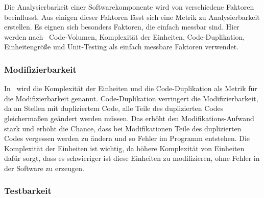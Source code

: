 \documentclass[12pt, a4paper, ngerman]{article}
\begin{document}
Die Analysierbarkeit einer Softwarekomponente wird von verschiedene Faktoren beeinflusst.
Aus einigen dieser Faktoren lässt sich eine Metrik zu Analysierbarkeit erstellen.
Es eignen sich besonders Faktoren, die einfach messbar sind.
Hier werden nach~\cite{maintainability_metrics} Code-Volumen, Komplexität der Einheiten,
Code-Duplikation, Einheitengröße und Unit-Testing als einfach messbare Faktoren verwendet.

\subsubsection{Modifizierbarkeit}

In~\cite{maintainability_metrics} wird die Komplexität der Einheiten und die Code-Duplikation
als Metrik für die Modifizierbarkeit genannt.
Code-Duplikation verringert die Modifizierbarkeit, da an Stellen mit dupliziertem Code,
alle Teile des duplizierten Codes gleichermaßen geändert werden müssen.
Das erhöht den Modifikations-Aufwand stark und erhöht die Chance,
dass bei Modifikationen Teile des duplizierten Codes vergessen werden zu ändern und so Fehler im Programm entstehen.
Die Komplexität der Einheiten ist wichtig, da höhere Komplexität von Einheiten dafür sorgt,
dass es schwieriger ist diese Einheiten zu modifizieren, ohne Fehler in der Software zu erzeugen.

\subsubsection{Testbarkeit}
\end{document}
